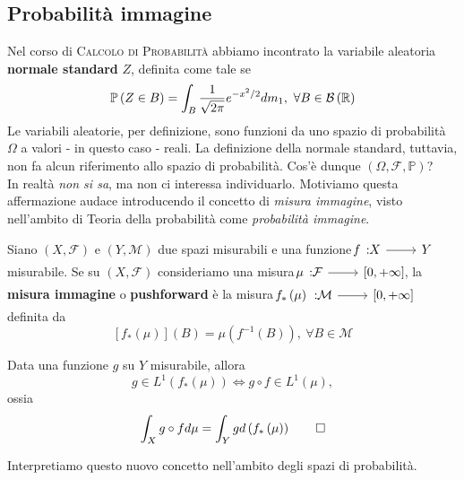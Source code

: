 \subsection{Probabilità immagine}\label{probimm}
Nel corso di \textsc{Calcolo di Probabilità} abbiamo incontrato la variabile aleatoria \textbf{normale standard} $Z$, definita come tale se
\begin{equation}
		\mathbb{P}\left(Z\in B\right)=\int_{B}\frac{1}{\sqrt{2\pi}}e^{-x^2/2}dm_1,\ \forall B\in\mathcal{B}\left(\mathbb{R}\right)
\end{equation}
Le variabili aleatorie, per definizione, sono funzioni da uno spazio di probabilità $\Omega$ a valori - in questo caso - reali. La definizione della normale standard, tuttavia, non fa alcun riferimento allo spazio di probabilità. Cos'è dunque  $\left(\Omega,\mathcal{F},\mathbb{P}\right)$?\\
In realtà \textit{non si sa}, ma non ci interessa individuarlo. Motiviamo questa affermazione audace introducendo il concetto di \textit{misura immagine}, visto nell'ambito di Teoria della probabilità come \textit{probabilità immagine}.
\begin{define}
	Siano $\left(X,\mathcal{F}\right)$ e $\left(Y,\mathcal{M}\right)$ due spazi misurabili e una funzione $\funz{f}{X}{Y}$ misurabile. Se su $\left(X,\mathcal{F}\right)$ consideriamo una misura $\funz{\mu}{\mathcal{F}}{\left[0,+\infty\right]}$, la \textbf{misura immagine} o \textbf{pushforward} è la misura $\funz{f_{\ast}\left(\mu\right)}{\mathcal{M}}{\left[0,+\infty\right]}$ definita da
	\begin{equation}
		\left[f_{\ast}\left(\mu\right)\right]\left(B\right)=\mu\left(f^{-1}\left(B\right)\right),\ \forall B\in \mathcal{M}
	\end{equation}
\end{define}
\begin{theoremaqed}
	Data una funzione $g$ su $Y$ misurabile, allora
	\begin{equation}
		g\in L^{1}\left(f_{\ast}\left(\mu\right)\right)\iff g\circ f\in L^{1}\left(\mu\right),
	\end{equation}
ossia
\begin{equation}
	\int_{X}g\circ fd\mu=\int_{Y}gd\left(f_{\ast}\left(\mu\right)\right)\qedhere
\end{equation}
\end{theoremaqed}
Interpretiamo questo nuovo concetto nell'ambito degli spazi di probabilità.
